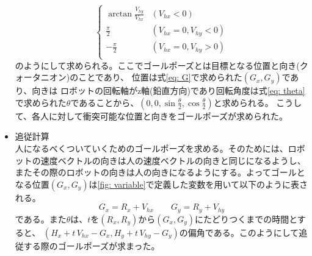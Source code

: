\documentclass{kuisthesis}
\begin{document}
\begin{itemize}
\begin{equation}
\begin{cases}
    \arctan{\frac{V_{hy}}{V_{hx}}} & (V_{hx} < 0)\\
    \frac{\pi}{2} & (V_{hx} = 0, V_{hy} < 0)\\
    -\frac{\pi}{2} & (V_{hx} = 0, V_{hy} > 0)\\
  \end{cases}
\end{equation}
のようにして求められる。ここでゴールポーズとは目標となる位置と向き(クォータニオン)のことであり、
位置は式\ref{eq: G}で求められた$(G_x, G_y)$であり、向きは
ロボットの回転軸がz軸(鉛直方向)であり回転角度は式\ref{eq: theta}で求められた$\theta$であることから、$(0, 0, \sin\frac{\theta}{2}, \cos\frac{\theta}{2})$と求められる。
こうして、各人に対して衝突可能な位置と向きをゴールポーズが求められた。

  \item 追従計算 \\
  人になるべくついていくためのゴールポーズを求める。そのためには、ロボットの速度ベクトルの向きは人の速度ベクトルの向きと同じになるようし、
  またその際のロボットの向きは人の向きになるようにする。よってゴールとなる位置$(G_x, G_y)$は\ref{fig: variable}で定義した変数を用いて以下のように表される。
  \begin{equation}G_x = R_x + V_{hx} \qquad G_y = R_y + V_{hy}\end{equation}
  である。また$\theta$は、$t$を$(R_x, R_y)$から$(G_x, G_y)$にたどりつくまでの時間とすると、
  $(H_x + t\,V_{hx} - G_x, H_y + t\,V_{hy} - G_y)$の偏角である。このようにして追従する際のゴールポーズが求まった。


\end{itemize}
\end{document}
